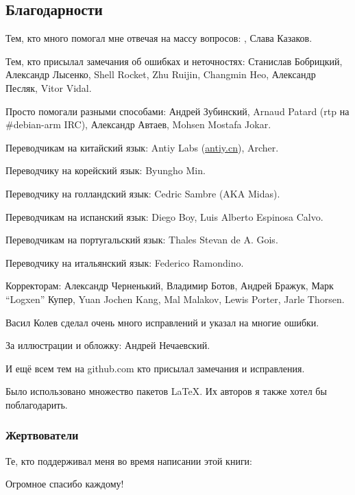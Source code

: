 \subsection*{Благодарности}

Тем, кто много помогал мне отвечая на массу вопросов: \HERMIT, Слава  Казаков.

Тем, кто присылал замечания об ошибках и неточностях:
Станислав  Бобрицкий, Александр Лысенко,
Shell Rocket, Zhu Ruijin, Changmin Heo, Александр  Песляк, Vitor Vidal.

Просто помогали разными способами:
Андрей Зубинский,
Arnaud Patard (rtp на \#debian-arm IRC),
Александр Автаев,
Mohsen Mostafa Jokar.

Переводчикам на китайский язык:
Antiy Labs (\href{http://antiy.cn}{antiy.cn}), Archer.

Переводчику на корейский язык: Byungho Min.

Переводчику на голландский язык: Cedric Sambre (AKA Midas).

Переводчикам на испанский язык: Diego Boy, Luis Alberto Espinosa Calvo.

Переводчикам на португальский язык: Thales Stevan de A. Gois.

Переводчику на итальянский язык: Federico Ramondino.

Корректорам:
Александр  Черненький,
Владимир Ботов,
Андрей Бражук,
Марк ``Logxen'' Купер, Yuan Jochen Kang, Mal Malakov, Lewis Porter, Jarle Thorsen.

Васил Колев сделал очень много исправлений и указал на многие ошибки.

За иллюстрации и обложку: Андрей Нечаевский.

И ещё всем тем на github.com кто присылал замечания и исправления.

Было использовано множество пакетов \LaTeX. Их авторов я также хотел бы поблагодарить.

\subsubsection*{Жертвователи}

Те, кто поддерживал меня во время написании этой книги:



Огромное спасибо каждому!

